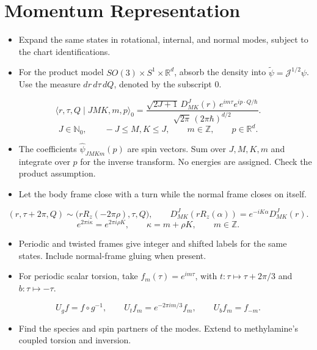 \documentclass[12pt]{article}
\newcommand{\R}{\mathbb{R}}
\begin{document}
\section{Momentum Representation}
\label{sec:momentum}
\begin{itemize}
\item Expand the same states in rotational, internal, and normal modes,
subject to the chart identifications.
\item For the product model $SO(3)\times S^1\times\R^d$, absorb
the density into $\widetilde\psi=\mathcal J^{1/2}\psi$.
Use the measure $dr\,d\tau\,dQ$, denoted by the subscript $0$.
\end{itemize}
\[
\langle r,\tau,Q\mid JMK,m,p\rangle_0
=\frac{\sqrt{2J+1}\,D^J_{MK}(r)\,e^{im\tau}e^{ip\cdot Q/\hbar}}
{\sqrt{2\pi}\,(2\pi\hbar)^{d/2}}.
\]
\[
J\in\mathbb N_0,\qquad -J\le M,K\le J,\qquad m\in\mathbb Z,
\qquad p\in\R^d.
\]
\begin{itemize}
\item The coefficients $\widehat\psi_{JMKm}(p)$ are spin vectors.
Sum over $J,M,K,m$ and integrate over $p$ for the inverse transform.
No energies are assigned. Check the product assumption.
\item Let the body frame close with a turn while the normal frame closes on itself.
\end{itemize}
\[
(r,\tau+2\pi,Q)\sim\bigl(rR_z(-2\pi\rho),\tau,Q\bigr),
\qquad D^J_{MK}(rR_z(\alpha))=e^{-iK\alpha}D^J_{MK}(r).
\]
\[
e^{2\pi i\kappa}=e^{2\pi i\rho K},\qquad
\kappa=m+\rho K,\qquad m\in\mathbb Z.
\]
\begin{itemize}
\item Periodic and twisted frames give integer and shifted labels for
the same states. Include normal-frame gluing when present.
\end{itemize}

\begin{itemize}
\item For periodic scalar torsion, take $f_m(\tau)=e^{im\tau}$,
with $t:\tau\mapsto\tau+2\pi/3$ and $b:\tau\mapsto-\tau$.
\end{itemize}
\[
U_gf=f\circ g^{-1},\qquad
U_tf_m=e^{-2\pi im/3}f_m,\qquad U_bf_m=f_{-m}.
\]
\begin{itemize}
\item Find the species and spin partners of the modes.
Extend to methylamine's coupled torsion and inversion.
\end{itemize}


\FloatBarrier


\end{document}
